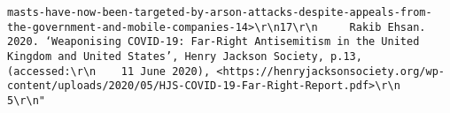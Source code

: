 \documentclass[
]{book}
\begin{document}
\begin{verbatim}
masts-have-now-been-targeted-by-arson-attacks-despite-appeals-from-the-government-and-mobile-companies-14>\r\n17\r\n     Rakib Ehsan. 2020. ‘Weaponising COVID-19: Far-Right Antisemitism in the United Kingdom and United States’, Henry Jackson Society, p.13, (accessed:\r\n    11 June 2020), <https://henryjacksonsociety.org/wp-content/uploads/2020/05/HJS-COVID-19-Far-Right-Report.pdf>\r\n                                                                               5\r\n"                                                                                                                                                                                                                                                                                                                                                                                                                                                                                                                                                                                                                                                                                                                                                                                                                                                                                                                                                                                                                                                                                                                                                                                                                                                                                                                                                                                                                                                                                                                                                                                                                                                                                                                                                                                                                                                                                                                                                                                                                                                                                                                                                                                                                                                                                                                                                                  

\end{verbatim}
\end{document}
